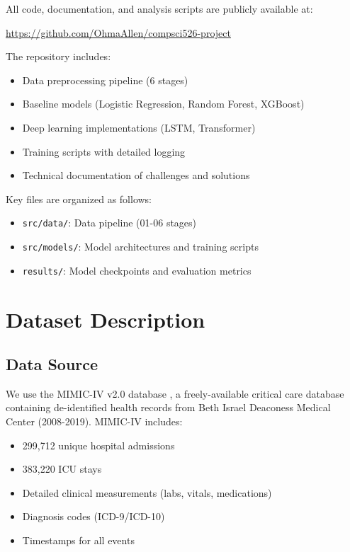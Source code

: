 \documentclass[conference]{IEEEtran}
\begin{document}
All code, documentation, and analysis scripts are publicly available at:

\begin{center}
\url{https://github.com/OhmaAllen/compsci526-project}
\end{center}

The repository includes:
\begin{itemize}
    \item Data preprocessing pipeline (6 stages)
    \item Baseline models (Logistic Regression, Random Forest, XGBoost)
    \item Deep learning implementations (LSTM, Transformer)
    \item Training scripts with detailed logging
    \item Technical documentation of challenges and solutions
\end{itemize}

Key files are organized as follows:
\begin{itemize}
    \item \texttt{src/data/}: Data pipeline (01-06 stages)
    \item \texttt{src/models/}: Model architectures and training scripts
    \item \texttt{results/}: Model checkpoints and evaluation metrics
\end{itemize}

\section{Dataset Description}

\subsection{Data Source}

We use the MIMIC-IV v2.0 database \cite{johnson2023mimic}, a freely-available critical care database containing de-identified health records from Beth Israel Deaconess Medical Center (2008-2019). MIMIC-IV includes:
\begin{itemize}
    \item 299,712 unique hospital admissions
    \item 383,220 ICU stays
    \item Detailed clinical measurements (labs, vitals, medications)
    \item Diagnosis codes (ICD-9/ICD-10)
    \item Timestamps for all events
\end{itemize}
\end{document}

